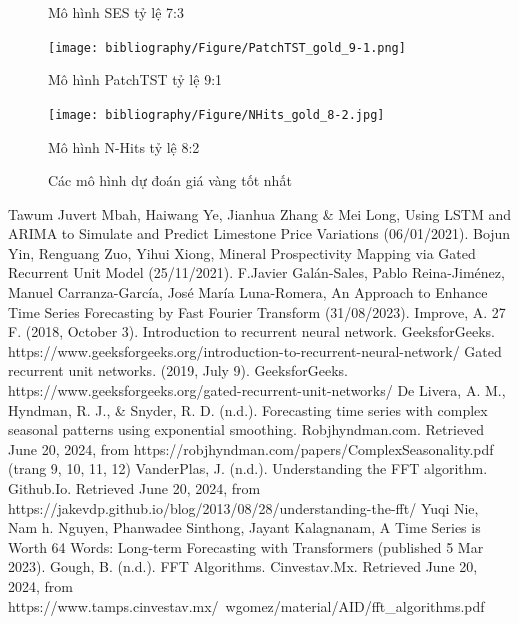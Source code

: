 \documentclass[conference]{IEEEtran}
\begin{document}
\begin{figure}[t]
\begin{minipage}{0.5\textwidth}
\begin{minipage}{0.45\textwidth}
            \caption{Mô hình SES tỷ lệ 7:3}
        \end{minipage}
        \hfill
        \begin{minipage}{0.45\textwidth}
            \centering
            \texttt{[image: bibliography/Figure/PatchTST\_gold\_9-1.png]} 
            \caption{Mô hình PatchTST tỷ lệ 9:1}
        \end{minipage}
        \begin{minipage}{0.45\textwidth}
            \centering
            \texttt{[image: bibliography/Figure/NHits\_gold\_8-2.jpg]} 
            \caption{Mô hình N-Hits tỷ lệ 8:2}
        \end{minipage}
    \end{minipage}
    \caption{Các mô hình dự đoán giá vàng tốt nhất}
    \label{fig:gold-images}
\end{figure}

\begin{thebibliography}{00}
     Tawum Juvert Mbah, Haiwang Ye, Jianhua Zhang & Mei Long,
    Using LSTM and ARIMA to Simulate and Predict Limestone Price Variations (06/01/2021).
     Bojun Yin, Renguang Zuo, Yihui Xiong, Mineral Prospectivity Mapping via Gated Recurrent Unit Model (25/11/2021).
     F.Javier Galán-Sales, Pablo Reina-Jiménez, Manuel Carranza-García, José María Luna-Romera, An Approach to Enhance Time Series Forecasting by Fast Fourier Transform (31/08/2023).
    Improve, A. 27 F. (2018, October 3). Introduction to recurrent neural network. GeeksforGeeks. https://www.geeksforgeeks.org/introduction-to-recurrent-neural-network/
    Gated recurrent unit networks. (2019, July 9). GeeksforGeeks. https://www.geeksforgeeks.org/gated-recurrent-unit-networks/
    De Livera, A. M., Hyndman, R. J., & Snyder, R. D. (n.d.). Forecasting time series with complex seasonal patterns using exponential smoothing. Robjhyndman.com. Retrieved June 20, 2024, from https://robjhyndman.com/papers/ComplexSeasonality.pdf (trang 9, 10, 11, 12)
     VanderPlas, J. (n.d.). Understanding the FFT algorithm. Github.Io. Retrieved June 20, 2024, from https://jakevdp.github.io/blog/2013/08/28/understanding-the-fft/
     Yuqi Nie, Nam h. Nguyen, Phanwadee Sinthong, Jayant Kalagnanam, A Time Series is Worth 64 Words: Long-term Forecasting with Transformers (published 5 Mar 2023).
     Gough, B. (n.d.). FFT Algorithms. Cinvestav.Mx. Retrieved June 20, 2024, from https://www.tamps.cinvestav.mx/~wgomez/material/AID/fft_algorithms.pdf
    
    \end{thebibliography}
    \vspace{12pt}
\end{document}
